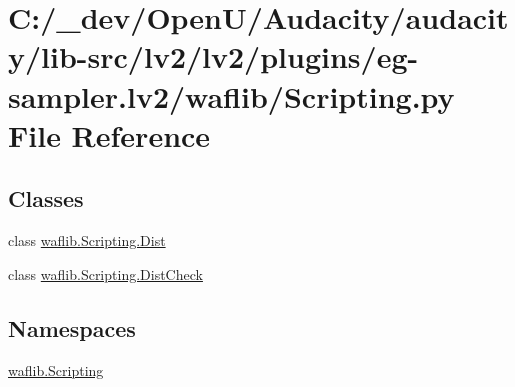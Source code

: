 \hypertarget{lv2_2plugins_2eg-sampler_8lv2_2waflib_2_scripting_8py}{}\section{C\+:/\+\_\+dev/\+Open\+U/\+Audacity/audacity/lib-\/src/lv2/lv2/plugins/eg-\/sampler.lv2/waflib/\+Scripting.py File Reference}
\label{lv2_2plugins_2eg-sampler_8lv2_2waflib_2_scripting_8py}
\subsection*{Classes}
\begin{DoxyCompactItemize}
\item 
class \hyperlink{classwaflib_1_1_scripting_1_1_dist}{waflib.\+Scripting.\+Dist}
\item 
class \hyperlink{classwaflib_1_1_scripting_1_1_dist_check}{waflib.\+Scripting.\+Dist\+Check}
\end{DoxyCompactItemize}
\subsection*{Namespaces}
\begin{DoxyCompactItemize}
\item 
 \hyperlink{namespacewaflib_1_1_scripting}{waflib.\+Scripting}
\end{DoxyCompactItemize}

